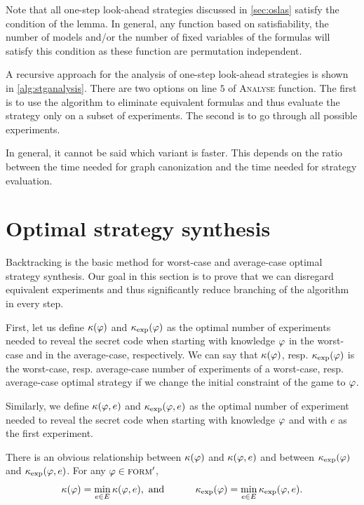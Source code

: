 Note that all one-step look-ahead strategies discussed in \autoref{sec:oslas}
  satisfy the condition of the lemma.
In general, any function based on satisfiability, the number of models and/or
  the number of fixed variables of the formulas will satisfy this condition as
  these function are permutation independent.

A recursive approach for the analysis of one-step look-ahead strategies
  is shown in \autoref{alg:stganalysis}.
There are two options on line $5$ of \textsc{Analyse} function.
The first is to use the algorithm to eliminate equivalent formulas and thus
  evaluate the strategy only on a subset of experiments.
The second is to go through all possible experiments.

In general, it cannot be said which variant is faster.
This depends on the ratio between the time
  needed for graph canonization and the
  time needed for strategy evaluation.

\section{Optimal strategy synthesis}

Backtracking is the basic method for worst-case and average-case
  optimal strategy synthesis.
Our goal in this section is to prove that we can disregard
  equivalent experiments and thus significantly
  reduce branching of the algorithm in every step.

\newcommand{\optval}{\kappa}
\newcommand{\optexp}{\varepsilon}
\newcommand{\optvale}{\kappa_\textrm{exp}}
\newcommand{\optexpe}{\varepsilon_\textrm{exp}}

First, let us define $\optval(\form)$ and $\optvale(\form)$ as
 the optimal number of experiments needed to reveal the secret code
  when starting with knowledge $\varphi$
  in the worst-case and in the average-case, respectively.
We can say that $\optval(\form)$, resp. $\optvale(\form)$ is
  the worst-case, resp. average-case number of experiments of
  a worst-case, resp. average-case optimal strategy
  if we change the initial constraint of the game to $\varphi$.

Similarly, we define $\optval(\form, e)$ and $\optvale(\form, e)$ as
  the optimal number of experiment needed to reveal the secret code
  when starting with knowledge $\varphi$ and
  with $e$ as the first experiment.

There is an obvious relationship between $\optval(\form)$ and $\optval(\form,e)$
  and between $\optvale(\form)$ and $\optvale(\form,e)$.
For any $\varphi\in{\textsc{form}'}$,
\begin{equation}
\optval(\form) = \min_{e\in\Exp}\optval(\form, e),\textrm{ and }
\hspace{1cm}
\optvale(\form) = \min_{e\in\Exp}\optvale(\form, e).
\label{opttriv}
\end{equation}

